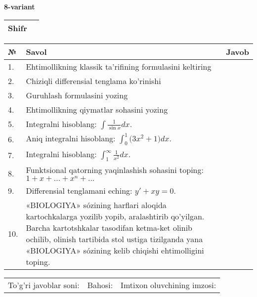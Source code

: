 \documentclass{article}
\begin{document}
  \egroup
  
  \newpage
  
  
  \textbf{8-variant}\\
  
  \bgroup
  \def\arraystretch{1.6} %
  
  \begin{tabular}{|m{5.7cm}|m{9.5cm}|}
  \hline
  Shifr & \\
  \hline
  \end{tabular}
  
  \vspace{1cm}
  
  \begin{tabular}{|m{0.7cm}|m{10cm}|m{4cm}|}
  \hline
  № & Savol & Javob \\
  \hline
  1. & Ehtimollikning klassik ta'rifining formulasini keltiring &  \\
  \hline
  2. & Chiziqli differensial tenglama ko'rinishi &  \\
  \hline
  3. & Guruhlash formulasini yozing &  \\
  \hline
  4. & Ehtimollikning qiymatlar sohasini yozing &  \\
  \hline
  5. & Integralni hisoblang: \(\int {\frac{1}{\sin x}dx}\). &  \\
  \hline
  6. & Aniq integralni hisoblang: \(\int_{0}^{1}{(3x^{2}} + 1)dx\). &  \\
  \hline
  7. & Integralni hisoblang: \(\int_{1}^{\infty}{\frac{1}{x^{2}}dx}\). &  \\
  \hline
  8. & Funktsional qatorning yaqinlashish sohasini toping:\(1 + x + ... + x^{n} + ...\) &  \\
  \hline
  9. & Differensial tenglamani eching: \(y' + xy = 0\). &  \\
  \hline
  10. & «BIOLOGIYA» sózining harflari aloqida kartochkalarga yozilib yopib, aralashtirib qo'yilgan. Barcha kartotshkalar tasodifan ketma-ket olinib ochilib, olinish tartibida stol ustiga tizilganda yana «BIOLOGIYA» sózining kelib chiqishi ehtimolligini toping. &  \\
  \hline
  \end{tabular}
  
  \vspace{1cm}
  
  \begin{tabular}{lll}
  To'g'ri javoblar soni: \underline{\hspace{1.5cm}} & 
  Bahosi: \underline{\hspace{1.5cm}} & 
  Imtixon oluvchining imzosi: \underline{\hspace{2cm}} \\
  \end{tabular}
  
\end{document}
